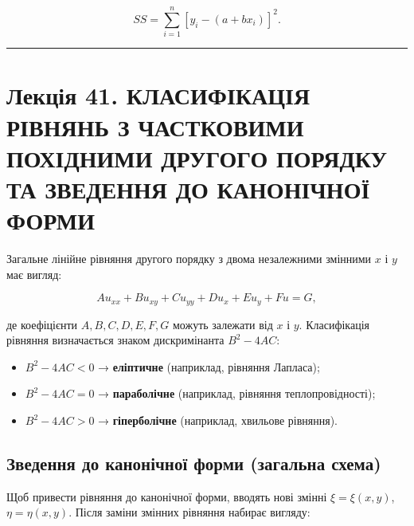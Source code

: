 \documentclass[
  ukrainian,
]{article}
\providecommand{\tightlist}{%
  \setlength{\itemsep}{0pt}\setlength{\parskip}{0pt}}
\begin{document}
\[SS = \sum_{i=1}^{n} [y_i - (a + bx_i)]^2.\]

\begin{center}\rule{0.5\linewidth}{0.5pt}\end{center}

\section{Лекція 41. КЛАСИФІКАЦІЯ РІВНЯНЬ З ЧАСТКОВИМИ ПОХІДНИМИ ДРУГОГО
ПОРЯДКУ ТА ЗВЕДЕННЯ ДО КАНОНІЧНОЇ
ФОРМИ}\label{ux43bux435ux43aux446ux456ux44f-41.-ux43aux43bux430ux441ux438ux444ux456ux43aux430ux446ux456ux44f-ux440ux456ux432ux43dux44fux43dux44c-ux437-ux447ux430ux441ux442ux43aux43eux432ux438ux43cux438-ux43fux43eux445ux456ux434ux43dux438ux43cux438-ux434ux440ux443ux433ux43eux433ux43e-ux43fux43eux440ux44fux434ux43aux443-ux442ux430-ux437ux432ux435ux434ux435ux43dux43dux44f-ux434ux43e-ux43aux430ux43dux43eux43dux456ux447ux43dux43eux457-ux444ux43eux440ux43cux438}

Загальне лінійне рівняння другого порядку з двома незалежними змінними
\(x\) і \(y\) має вигляд:

\[A u_{xx} + B u_{xy} + C u_{yy} + D u_x + E u_y + F u = G,\]

де коефіцієнти \(A, B, C, D, E, F, G\) можуть залежати від \(x\) і
\(y\). Класифікація рівняння визначається знаком дискримінанта
\(B^2 - 4AC\):

\begin{itemize}
\tightlist
\item
  \(B^2 - 4AC < 0\) → \textbf{еліптичне} (наприклад, рівняння Лапласа);
\item
  \(B^2 - 4AC = 0\) → \textbf{параболічне} (наприклад, рівняння
  теплопровідності);
\item
  \(B^2 - 4AC > 0\) → \textbf{гіперболічне} (наприклад, хвильове
  рівняння).
\end{itemize}

\subsection{Зведення до канонічної форми (загальна
схема)}\label{ux437ux432ux435ux434ux435ux43dux43dux44f-ux434ux43e-ux43aux430ux43dux43eux43dux456ux447ux43dux43eux457-ux444ux43eux440ux43cux438-ux437ux430ux433ux430ux43bux44cux43dux430-ux441ux445ux435ux43cux430}

Щоб привести рівняння до канонічної форми, вводять нові змінні
\(\xi = \xi(x, y)\), \(\eta = \eta(x, y)\). Після заміни змінних
рівняння набирає вигляду:
\end{document}
